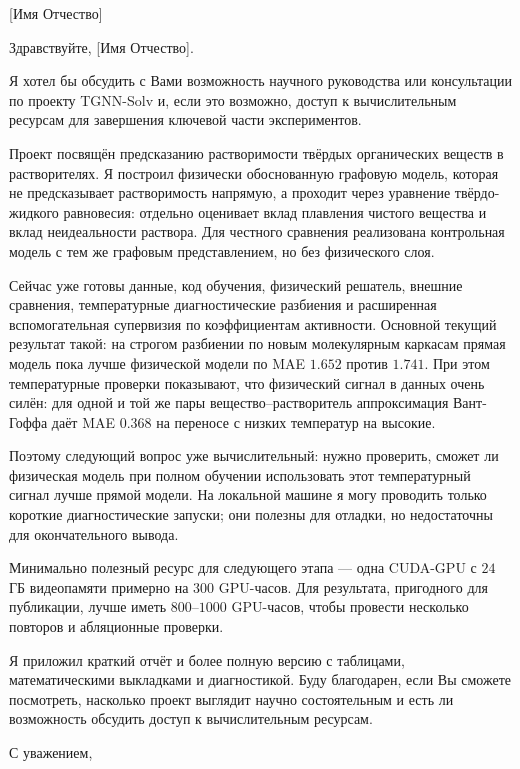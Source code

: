 \documentclass[11pt]{letter}
\date{18 апреля 2026 г.}
\begin{document}
\begin{letter}{[Имя Отчество]}
\opening{Здравствуйте, [Имя Отчество].}

Я хотел бы обсудить с Вами возможность научного руководства или консультации по проекту TGNN-Solv и, если это возможно, доступ к вычислительным ресурсам для завершения ключевой части экспериментов.

Проект посвящён предсказанию растворимости твёрдых органических веществ в растворителях. Я построил физически обоснованную графовую модель, которая не предсказывает растворимость напрямую, а проходит через уравнение твёрдо-жидкого равновесия: отдельно оценивает вклад плавления чистого вещества и вклад неидеальности раствора. Для честного сравнения реализована контрольная модель с тем же графовым представлением, но без физического слоя.

Сейчас уже готовы данные, код обучения, физический решатель, внешние сравнения, температурные диагностические разбиения и расширенная вспомогательная супервизия по коэффициентам активности. Основной текущий результат такой: на строгом разбиении по новым молекулярным каркасам прямая модель пока лучше физической модели по MAE $1.652$ против $1.741$. При этом температурные проверки показывают, что физический сигнал в данных очень силён: для одной и той же пары вещество--растворитель аппроксимация Вант-Гоффа даёт MAE $0.368$ на переносе с низких температур на высокие.

Поэтому следующий вопрос уже вычислительный: нужно проверить, сможет ли физическая модель при полном обучении использовать этот температурный сигнал лучше прямой модели. На локальной машине я могу проводить только короткие диагностические запуски; они полезны для отладки, но недостаточны для окончательного вывода.

Минимально полезный ресурс для следующего этапа --- одна CUDA-GPU с $24$ ГБ видеопамяти примерно на $300$ GPU-часов. Для результата, пригодного для публикации, лучше иметь $800$--$1000$ GPU-часов, чтобы провести несколько повторов и абляционные проверки.

Я приложил краткий отчёт и более полную версию с таблицами, математическими выкладками и диагностикой. Буду благодарен, если Вы сможете посмотреть, насколько проект выглядит научно состоятельным и есть ли возможность обсудить доступ к вычислительным ресурсам.

\closing{С уважением,}
\end{letter}
\end{document}
